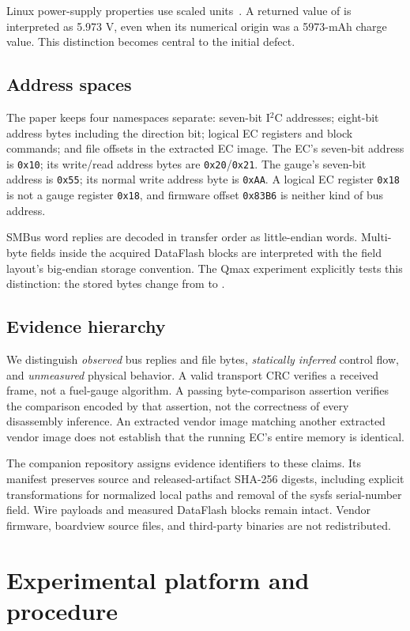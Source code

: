 \documentclass[11pt,a4paper]{article}
\newcommand{\hex}[1]{\texttt{0x#1}}
\newcommand{\code}[1]{\texttt{\detokenize{#1}}}
\begin{document}
Linux power-supply properties use scaled units~\cite{linux-battery}. A returned value of \code{voltage_now=5973000} is interpreted as 5.973 V, even when its numerical origin was a 5973-mAh charge value. This distinction becomes central to the initial defect.

\subsection{Address spaces}
The paper keeps four namespaces separate: seven-bit I$^2$C addresses; eight-bit address bytes including the direction bit; logical EC registers and block commands; and file offsets in the extracted EC image. The EC's seven-bit address is \hex{10}; its write/read address bytes are \hex{20}/\hex{21}. The gauge's seven-bit address is \hex{55}; its normal write address byte is \hex{AA}. A logical EC register \hex{18} is not a gauge register \hex{18}, and firmware offset \hex{83B6} is neither kind of bus address.

SMBus word replies are decoded in transfer order as little-endian words. Multi-byte fields inside the acquired DataFlash blocks are interpreted with the field layout's big-endian storage convention. The Qmax experiment explicitly tests this distinction: the stored bytes change from \code{1e 28} to \code{22 5a}.

\subsection{Evidence hierarchy}
We distinguish \emph{observed} bus replies and file bytes, \emph{statically inferred} control flow, and \emph{unmeasured} physical behavior. A valid transport CRC verifies a received frame, not a fuel-gauge algorithm. A passing byte-comparison assertion verifies the comparison encoded by that assertion, not the correctness of every disassembly inference. An extracted vendor image matching another extracted vendor image does not establish that the running EC's entire memory is identical.

The companion repository assigns evidence identifiers to these claims. Its manifest preserves source and released-artifact SHA-256 digests, including explicit transformations for normalized local paths and removal of the sysfs serial-number field. Wire payloads and measured DataFlash blocks remain intact. Vendor firmware, boardview source files, and third-party binaries are not redistributed.

\section{Experimental platform and procedure}
\end{document}
